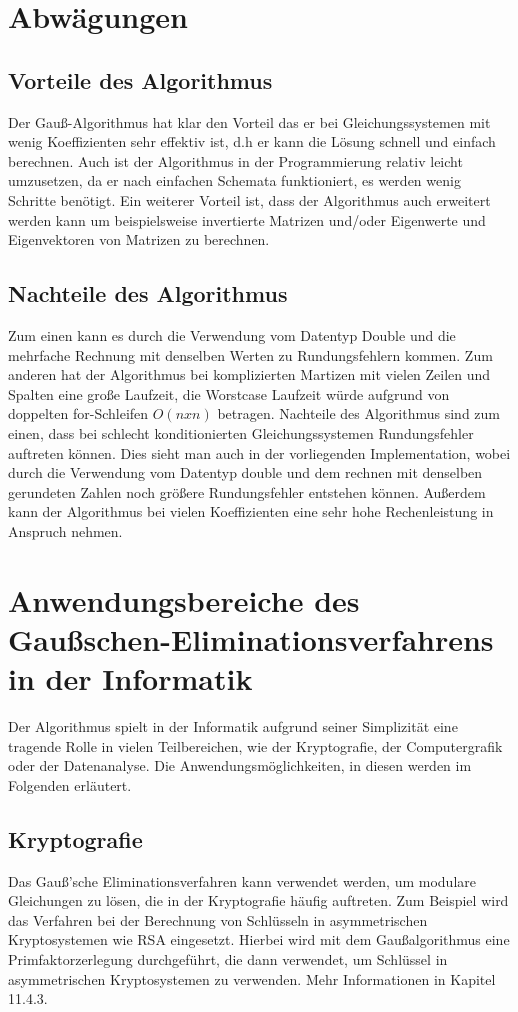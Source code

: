 \documentclass[a4paper, 12pt]{report}
\begin{document}
\begin{sloppypar}
\chapter{Abwägungen}

\section{Vorteile des Algorithmus}
Der Gauß-Algorithmus hat klar den Vorteil das er bei Gleichungssystemen mit wenig Koeffizienten sehr effektiv ist, d.h er kann die Lösung schnell und einfach berechnen.
Auch ist der Algorithmus in der Programmierung relativ leicht umzusetzen, da er nach einfachen Schemata funktioniert, es werden wenig Schritte benötigt.
Ein weiterer Vorteil ist, dass der Algorithmus auch erweitert werden kann um beispielsweise invertierte Matrizen und/oder Eigenwerte und Eigenvektoren von Matrizen zu berechnen.
\section{Nachteile des Algorithmus}
Zum einen kann es durch die Verwendung vom Datentyp Double und die mehrfache Rechnung mit denselben Werten zu Rundungsfehlern kommen.
Zum anderen hat der Algorithmus bei komplizierten Martizen mit vielen Zeilen und Spalten eine große Laufzeit, die Worstcase Laufzeit würde aufgrund von doppelten for-Schleifen $ O(n x n) $ betragen.
Nachteile des Algorithmus sind zum einen, dass bei schlecht konditionierten Gleichungssystemen Rundungsfehler auftreten können.
Dies sieht man auch in der vorliegenden Implementation, wobei durch die Verwendung vom Datentyp double und dem rechnen mit denselben gerundeten Zahlen noch größere Rundungsfehler entstehen können.
Außerdem kann der Algorithmus bei vielen Koeffizienten eine
sehr hohe Rechenleistung in Anspruch nehmen.
\chapter{Anwendungsbereiche des Gaußschen-Eliminationsverfahrens in der Informatik}
Der Algorithmus spielt in der Informatik aufgrund seiner Simplizität eine tragende Rolle in vielen Teilbereichen, wie der Kryptografie, der Computergrafik oder der Datenanalyse. Die Anwendungsmöglichkeiten, in diesen werden im Folgenden erläutert.
\section{Kryptografie}
Das Gauß'sche Eliminationsverfahren kann verwendet werden, um modulare Gleichungen zu lösen, die in der Kryptografie häufig auftreten.
Zum Beispiel wird das Verfahren bei der Berechnung von Schlüsseln in asymmetrischen Kryptosystemen wie RSA eingesetzt. Hierbei wird mit dem Gaußalgorithmus eine Primfaktorzerlegung durchgeführt, die dann
verwendet, um Schlüssel in asymmetrischen Kryptosystemen zu verwenden. Mehr Informationen in \cite{3} Kapitel 11.4.3.


\end{sloppypar}
\end{document}
